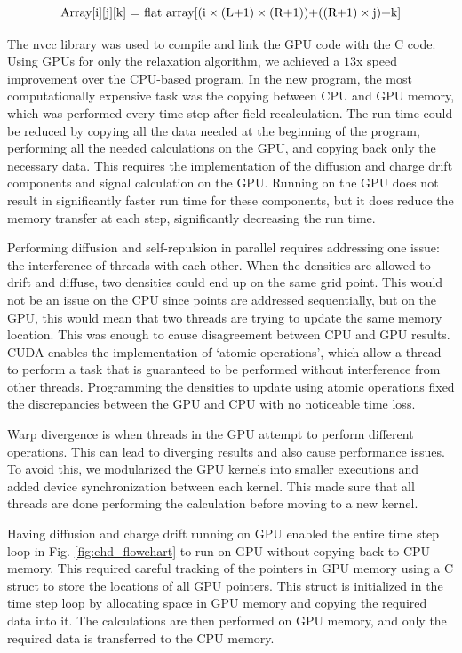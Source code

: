 \begin{equation}{\label{flat_array}}
 \text{Array[i][j][k] = flat array[(i} \times \text{(L+1)}\times \text{(R+1))+((R+1)}\times \text{j)+k]}
\end{equation}

The nvcc library was used to compile and link the GPU {\cpp} code with the {\ehd} C code. Using GPUs for only the relaxation algorithm, we achieved a $13$x speed improvement over the CPU-based program. In the new program, the most computationally expensive task was the copying between CPU and GPU memory, which was performed every time step after field recalculation. The run time could be reduced by copying all the data needed at the beginning of the program, performing all the needed calculations on the GPU, and copying back only the necessary data. This requires the implementation of the diffusion and charge drift components and signal calculation on the GPU. Running on the GPU does not result in significantly faster run time for these components, but it does reduce the memory transfer at each step, significantly decreasing the run time.

Performing diffusion and self-repulsion in parallel requires addressing one issue: the interference of threads with each other. When the densities are allowed to drift and diffuse, two densities could end up on the same grid point. This would not be an issue on the CPU since points are addressed sequentially, but on the GPU, this would mean that two threads are trying to update the same memory location. This was enough to cause disagreement between CPU and GPU results. CUDA enables the implementation of `atomic operations', which allow a thread to perform a task that is guaranteed to be performed without interference from other threads. Programming the densities to update using atomic operations fixed the discrepancies between the GPU and CPU with no noticeable time loss.

Warp divergence is when threads in the GPU attempt to perform different operations. This can lead to diverging results and also cause performance issues. To avoid this, we modularized the GPU kernels into smaller executions and added device synchronization between each kernel. This made sure that all threads are done performing the calculation before moving to a new kernel.

Having diffusion and charge drift running on GPU enabled the entire time step loop in Fig. \ref{fig:ehd_flowchart} to run on GPU without copying back to CPU memory. This required careful tracking of the pointers in GPU memory using a C struct to store the locations of all GPU pointers. This struct is initialized in the time step loop by allocating space in GPU memory and copying the required data into it. The calculations are then performed on GPU memory, and only the required data is transferred to the CPU memory.

